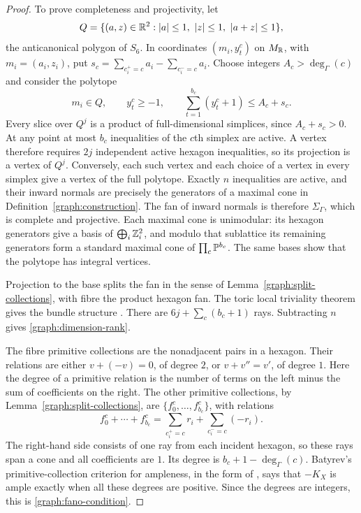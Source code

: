 \begin{proof}
To prove completeness and projectivity, let
\begin{equation}\label{graph:dual-hexagon}
 Q=\{(a,z)\in\mathbb{R}^2: |a|\le1,\ |z|\le1,\ |a+z|\le1\},
\end{equation}
the anticanonical polygon of $S_6$.  In coordinates
$(m_i,y^c_t)$ on $M_{\mathbb{R}}$, with $m_i=(a_i,z_i)$, put
$s_c=\sum_{c_i^+=c}a_i-\sum_{c_i^-=c}a_i$.
Choose integers $A_c>\deg_\Gamma(c)$ and consider the polytope
\[
 m_i\in Q,\qquad y^c_t\ge-1,\qquad
 \sum_{t=1}^{b_c}(y^c_t+1)\le A_c+s_c.
\]
Every slice over $Q^j$ is a product of full-dimensional simplices,
since $A_c+s_c>0$.  At any point at most $b_c$ inequalities of the
$c$th simplex are active.  A vertex therefore requires $2j$ independent
active hexagon inequalities, so its projection is a vertex of $Q^j$.
Conversely, each such vertex and each choice of a vertex in every
simplex give a vertex of the full polytope.  Exactly $n$ inequalities
are active, and their inward normals are precisely the generators of a
maximal cone in Definition~\ref{graph:construction}.
The fan of inward normals is therefore $\Sigma_\Gamma$, which is
complete and projective. Each maximal cone is unimodular: its
hexagon generators give a basis of $\bigoplus_i\mathbb{Z}^2_i$, and modulo that
sublattice its remaining generators form a standard maximal cone of
$\prod_c\mathbb{P}^{b_c}$. The same bases show that the polytope has integral
vertices.

Projection to the base splits the fan in the sense of
Lemma~\ref{graph:split-collections}, with fibre the product hexagon fan.
The toric local triviality theorem gives the bundle structure
\cite[Theorem~3.3.19]{CoxLittleSchenck2011}.
There are $6j+\sum_c(b_c+1)$ rays.  Subtracting $n$ gives
\eqref{graph:dimension-rank}.

The fibre primitive collections are the nonadjacent pairs in a
hexagon.  Their relations are either $v+(-v)=0$, of degree $2$, or
$v+v''=v'$, of degree $1$.  Here the degree of a primitive relation
is the number of terms on the left minus the sum of coefficients on
the right.  The other primitive collections, by
Lemma~\ref{graph:split-collections}, are
$\{f^c_0,\ldots,f^c_{b_c}\}$, with relations
\begin{equation}\label{graph:primitive-relations}
 f^c_0+\cdots+f^c_{b_c}
 =\sum_{c_i^+=c}r_i+\sum_{c_i^-=c}(-r_i).
\end{equation}
The right-hand side consists of one ray from each incident hexagon,
so these rays span a cone and all coefficients are $1$.  Its degree
is $b_c+1-\deg_\Gamma(c)$.  Batyrev's primitive-collection criterion
for ampleness, in the form of
\cite[Theorem~6.4.9(b)]{CoxLittleSchenck2011}, says that $-K_X$ is ample
exactly when all these degrees are positive.  Since the degrees are
integers, this is \eqref{graph:fano-condition}.


\end{proof}
